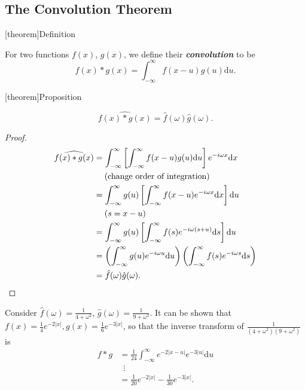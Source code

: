 \documentclass[12pt]{report}
\theoremstyle{definition}
\begin{document}
\subsection{The Convolution Theorem}

[theorem]{Definition}
\begin{convolution}
    For two functions $f(x)$, $g(x)$, we define their \textbf{\emph{convolution}} to be\[
        f(x)*g(x) = \int_{-\infty}^{\infty} f(x-u)g(u)\mathrm{d}u.
    \]
\end{convolution}

[theorem]{Proposition}
\begin{convolution property}
    \[
        \widehat{f(x)*g(x)} = \hat{f}(\omega)\hat{g}(\omega).
    \]
\end{convolution property}

\begin{proof}
    \begin{align*}
        \widehat{f(x)*g(x)} 
        & = \int_{-\infty}^{\infty} \left[\int_{-\infty}^{\infty} f(x-u)g(u)\mathrm{d}u\right]
        e^{-i\omega x}\mathrm{d}x \\
        & \quad\;\textnormal{(change order of integration)}\;\\
        & = \int_{-\infty}^{\infty} g(u)\left[\int_{-\infty}^{\infty} 
        f(x-u)e^{-i\omega x}\mathrm{d}x\right]\mathrm{d}u \\
        & \quad\;(s = x-u) \\
        & = \int_{-\infty}^{\infty} g(u) \left[\int_{-\infty}^{\infty} 
        f(s)e^{-i\omega(s+u)}\mathrm{d}s\right]\mathrm{d}u \\
        & = \left(\int_{-\infty}^{\infty} g(u)e^{-i\omega u}\mathrm{d}u\right)
        \left(\int_{-\infty}^{\infty} f(s)e^{-i\omega s}\mathrm{d}s\right) \\
        & = \hat{f}(\omega)\hat{g}(\omega).
    \end{align*} 
\end{proof} 

\begin{ex}
    Consider $\hat{f}(\omega) = \frac{1}{4+\omega^{2}}$, $\hat{g}(\omega) = \frac{1}{9+\omega^{2}}$.
    It can be shown that $f(x) = \frac{1}{4}e^{-2|x|}, g(x) = \frac{1}{6}e^{-3|x|}$,
    so that the inverse transform of $\frac{1}{(4+\omega^{2})(9+\omega^{2})}$ is
    \begin{align*}
        f*g
        & = \frac{1}{24}\int_{-\infty}^{\infty} e^{-2|x-u|}e^{-3|u|}\mathrm{d}u \\
        & \;\:\vdots \\
        & = \frac{1}{20}e^{-2|x|}-\frac{1}{30}e^{-3|x|}.
    \end{align*} 
\end{ex} 
\end{document}
